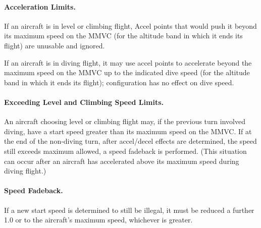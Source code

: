 \paragraph{Acceleration Limits.} If an aircraft is in level or climbing flight, Accel points that would push it beyond its maximum speed on the MMVC (for the altitude band in which it ends its flight) are unusable and ignored. 

If an aircraft is in diving flight, it may use accel points to accelerate beyond the maximum speed on the MMVC up to the indicated dive speed (for the altitude band in which it ends its flight); configuration has no effect on dive speed. 

\paragraph{Exceeding Level and Climbing Speed Limits.} An aircraft choosing level or climbing flight may, if the previous turn involved diving, have a start speed greater than its maximum speed on the MMVC. If at the end of the non-diving turn, after accel/decel effects are determined, the speed still exceeds maximum allowed, a speed fadeback is performed. (This situation can occur after an aircraft has accelerated above its maximum speed during diving flight.)

\paragraph{Speed Fadeback.} If a new start speed is determined to still be illegal, it must be reduced a further 1.0 or to the aircraft's maximum speed, whichever is greater. 

